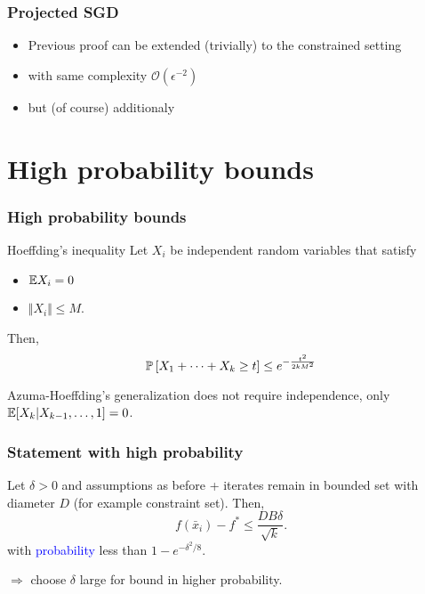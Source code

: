 \documentclass{beamer}
\begin{document}
\begin{frame}
  \frametitle{Projected SGD}

  \begin{itemize}
    \item Previous proof can be extended (trivially) to the constrained setting
    \item with same complexity $\mathcal{O}(\epsilon^{-2})$
    \item but (of course) additionaly
  \end{itemize}

\end{frame}

\section{High probability bounds}%
\label{sec:}

\begin{frame}
  \frametitle{High probability bounds}

  \begin{theorem}{Hoeffding's inequality}
    Let $X_i$ be independent random variables that satisfy
    \begin{itemize}
      \item $\E X_i = 0$
      \item $\Vert X_i \Vert \le M$.
    \end{itemize}
    Then,
    \begin{equation}
      \P\left[ X_1+ \dots + X_k \ge t\right] \le e^{-\frac{t^2}{2kM^2}}
    \end{equation}
  \end{theorem}

  Azuma-Hoeffding's generalization does not require independence, only $\E[X_k| X_{k-1}, \dots, 1]=0$.
\end{frame}


\begin{frame}
  \frametitle{Statement with high probability}
  \begin{theorem}
    Let $\delta>0$ and assumptions as before + iterates remain in bounded set with diameter $D$ (for example constraint set). Then,
    \begin{equation}
       f(\bar{x}_i) - f^* \le \frac{D B \delta}{\sqrt{k}}.
    \end{equation}
    with \textcolor{blue}{probability} less than $1-e^{-\delta^2/8}$.
  \end{theorem}
  $\Rightarrow$ choose $\delta$ large for bound in higher probability.
\end{frame}
\end{document}
